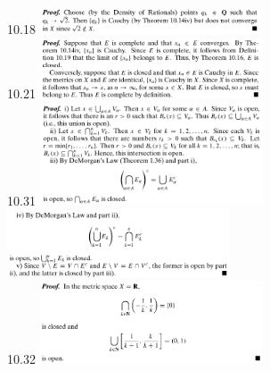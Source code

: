 \documentclass[8pt,landscape]{article}
\begin{document}
\begin{multicols}{3}
    10.18
    \includegraphics[width=250]{10_18.png} \\
    10.21
    \includegraphics[width=250]{10_21.png} \\
    10.31
    \includegraphics[width=250]{10_31a.png} \\
    \includegraphics[width=250]{10_31b.png} \\
    10.32
    \includegraphics[width=250]{10_32.png} \\

\end{multicols}
\end{document}
